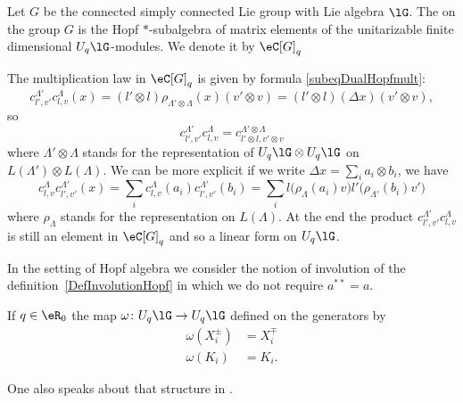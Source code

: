 \begin{definition}
	Let \( G\) be the connected simply connected Lie group with Lie algebra \( \lG\). The  on the group \( G\) is the Hopf \( *\)-subalgebra of matrix elements of the unitarizable finite dimensional \( U_q\lG\)-modules. We denote it by \( \eC[G]_q\)
\end{definition}

The multiplication law in \( \eC[G]_q\) is given by formula \eqref{subeqDualHopfmult}:
\begin{equation}
	c^{\Lambda'}_{l',v'}c^{\Lambda}_{l,v}(x)=(l'\otimes l)\rho_{\Lambda'\otimes \Lambda}(x)(v'\otimes v)=(l'\otimes l)(\Delta x)(v'\otimes v),
\end{equation}
so
\begin{equation}
	c^{\Lambda'}_{l',v'}c^{\Lambda}_{l,v}=c^{\Lambda'\otimes\Lambda}_{l'\otimes l,v'\otimes v}
\end{equation}
where \( \Lambda'\otimes\Lambda\) stands for the representation of \(U_q\lG\otimes U_q\lG\) on \( L(\Lambda')\otimes L(\Lambda)\). We can be more explicit if we write \( \Delta x=\sum_i a_i\otimes b_i\), we have
\begin{equation}
	c^{\Lambda}_{l,v}c^{\Lambda'}_{l',v'}(x)=\sum_i c^{\Lambda}_{l,v}(a_i)c^{\Lambda'}_{l',v'}(b_i)=\sum_il\big( \rho_{\Lambda}(a_i)v \big)l'\big( \rho_{\Lambda'}(b_i)v' \big)
\end{equation}
where \( \rho_{\Lambda}\) stands for the representation on \( L(\Lambda)\). At the end the product \( c^{\Lambda'}_{l',v'}c^{\Lambda}_{l,v}\) is still an element in \( \eC[G]_q\) and so a linear form on \( U_q\lG\).

\begin{remark}
	In the setting of Hopf algebra we consider the notion of involution of the definition~\ref{DefInvolutionHopf} in which we do not require \( a^{**}=a\).
\end{remark}

\begin{proposition}
	If \( q\in\eR_0\) the map \( \omega\colon U_q\lG\to U_q\lG\) defined on the generators by
	\begin{subequations}
		\begin{align}
			\omega(X^{\pm}_{i}) & =X^{\mp}_i \\
			\omega(K_i)         & =K_i.
		\end{align}
	\end{subequations}
\end{proposition}
One also speaks about that structure in \cite{SoilSchubert}.

